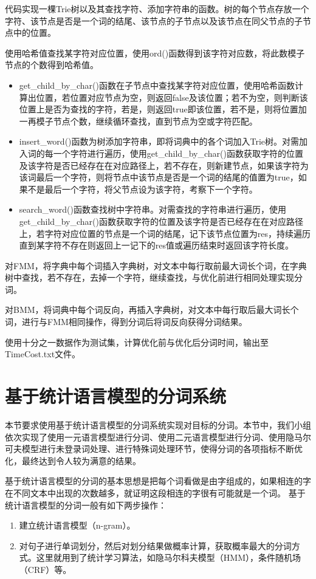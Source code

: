 \documentclass[11pt,a4paper]{article}
\begin{document}
	代码实现一棵Trie树以及其查找字符、添加字符串的函数。树的每个节点存放一个字符、该节点是否是一个词的结尾、该节点的子节点以及该节点在同父节点的子节点中的位置。
	
	使用哈希值查找某字符对应位置，使用ord()函数得到该字符对应数，将此数模子节点的个数得到哈希值。
	\begin{itemize}
		
	\item get\_child\_by\_char()函数在子节点中查找某字符对应位置，使用哈希函数计算出位置，若位置对应节点为空，则返回false及该位置；若不为空，则判断该位置上是否为查找的字符，若是，则返回true即该位置，若不是，则将位置加一再模子节点个数，继续循环查找，直到节点为空或字符匹配。
	\item insert\_word()函数为树添加字符串，即将词典中的各个词加入Trie树。对需加入词的每一个字符进行遍历，使用get\_child\_by\_char()函数获取字符的位置及该字符是否已经存在在对应路径上，若不存在，则新建节点，如果该字符为该词最后一个字符，则将节点中该节点是否是一个词的结尾的值置为true，如果不是最后一个字符，将父节点设为该字符，考察下一个字符。
	\item search\_word()函数查找树中字符串。对需查找的字符串进行遍历，使用get\_child\_by\_char()函数获取字符的位置及该字符是否已经存在在对应路径上，若字符对应位置的节点是一个词的结尾，记下该节点位置为res，持续遍历直到某字符不存在则返回上一记下的res值或遍历结束时返回该字符长度。
	\end{itemize}

	对FMM，将字典中每个词插入字典树，对文本中每行取前最大词长个词，在字典树中查找，若不存在，去掉一个字符，继续查找，与优化前进行相同处理实现分词。
	
	对BMM，将词典中每个词反向，再插入字典树，对文本中每行取后最大词长个词，进行与FMM相同操作，得到分词后将词反向获得分词结果。
	
	使用十分之一数据作为测试集，计算优化前与优化后分词时间，输出至TimeCost.txt文件。
	
	
	
	
	\section{基于统计语言模型的分词系统}
	本节要求使用基于统计语言模型的分词系统实现对目标的分词。本节中，我们小组依次实现了使用一元语言模型进行分词、使用二元语言模型进行分词、使用隐马尔可夫模型进行未登录词处理、进行特殊词处理环节，使得分词的各项指标不断优化，最终达到令人较为满意的结果。
	
	基于统计语言模型的分词的基本思想是把每个词看做是由字组成的，如果相连的字在不同文本中出现的次数越多，就证明这段相连的字很有可能就是一个词。
	基于统计语言模型的分词一般有如下两步操作：
	\begin{enumerate}
		\item 建立统计语言模型（n-gram）。
		\item 对句子进行单词划分，然后对划分结果做概率计算，获取概率最大的分词方式。这里就用到了统计学习算法，如隐马尔科夫模型（HMM），条件随机场（CRF）等。
	\end{enumerate}
	
\end{document}
